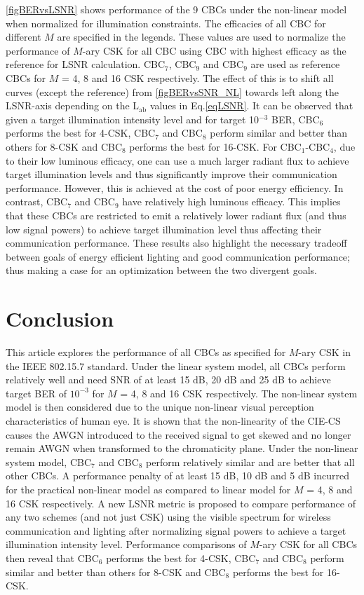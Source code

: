 \documentclass[10pt,letterpaper]{article}
\begin{document}
\figurename{ }\ref{figBERvsLSNR} shows performance of the 9 CBCs under the non-linear model when normalized for illumination constraints. The efficacies of all CBC for different $M$ are specified in the legends. These values are used to normalize the performance of $M$-ary CSK for all CBC using CBC with highest efficacy as the reference for LSNR calculation. CBC$_{7}$, CBC$_{9}$ and CBC$_{9}$ are used as reference CBCs for $M$ = 4, 8 and 16 CSK respectively. The effect of this is to shift all curves (except the reference) from \figurename{ }\ref{figBERvsSNR_NL} towards left along the LSNR-axis depending on the L$_{\text{ab}}$ values in Eq.\eqref{eqLSNR}. It can be observed that given a target illumination intensity level and for target 10$^{-3}$ BER, CBC$_{6}$ performs the best for 4-CSK, CBC$_{7}$ and CBC$_{8}$ perform similar and better than others for 8-CSK and CBC$_{8}$ performs the best for 16-CSK. For CBC$_{1}$-CBC$_{4}$, due to their low luminous efficacy, one can use a much larger radiant flux to achieve target illumination levels and thus significantly improve their communication performance. However, this is achieved at the cost of poor energy efficiency. In contrast, CBC$_{7}$ and CBC$_{9}$ have relatively high luminous efficacy. This implies that these CBCs are restricted to emit a relatively lower radiant flux (and thus low signal powers) to achieve target illumination level thus affecting their communication performance. These results also highlight the necessary tradeoff between goals of energy efficient lighting and good communication performance; thus making a case for an optimization between the two divergent goals.

\section{Conclusion}\label{sCONC}

This article explores the performance of all CBCs as specified for $M$-ary CSK in the IEEE 802.15.7 standard. Under the linear system model, all CBCs perform relatively well and need SNR of at least 15 dB, 20 dB and 25 dB to
achieve target BER of $10^{-3}$ for $M$ = 4, 8 and 16 CSK respectively. The
non-linear system model is then considered due to the unique non-linear visual perception characteristics of human eye. It is shown that the
non-linearity of the CIE-CS causes the AWGN
introduced to the received signal to get skewed and no longer remain AWGN
when transformed to the chromaticity plane. Under the non-linear
system model, CBC$_{7}$ and CBC$_{8}$ perform relatively similar and are better that all other CBCs. A performance penalty
of at least 15 dB, 10 dB and 5 dB incurred for the practical non-linear model as compared to linear model for
$M$ = 4, 8 and 16 CSK respectively. A new LSNR metric is proposed
to compare performance of any two schemes (and not just CSK) using the visible
spectrum for wireless communication and lighting after normalizing signal powers to achieve a target illumination intensity level. Performance comparisons of $M$-ary CSK for all CBCs then reveal that CBC$_{6}$ performs the best for
4-CSK, CBC$_{7}$ and CBC$_{8}$ perform similar and better than others for 8-CSK and CBC$_{8}$ performs the best for 16-CSK. 
\end{document}

